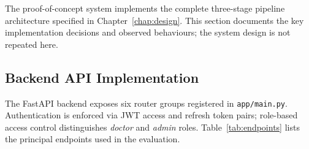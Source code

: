 \documentclass[12pt,a4paper]{report}
\begin{document}
	The proof-of-concept system implements the complete three-stage pipeline
	architecture specified in Chapter~\ref{chap:design}.  This section documents the key
	implementation decisions and observed behaviours; the system design is
	not repeated here.
	
	\subsection{Backend API Implementation}
	\label{subsec:api_impl}
	
	The FastAPI backend exposes six router groups registered in
	\texttt{app/main.py}.  Authentication is enforced via JWT access and
	refresh token pairs; role-based access control distinguishes
	\textit{doctor} and \textit{admin} roles.  Table~\ref{tab:endpoints}
	lists the principal endpoints used in the evaluation.
	
\end{document}

